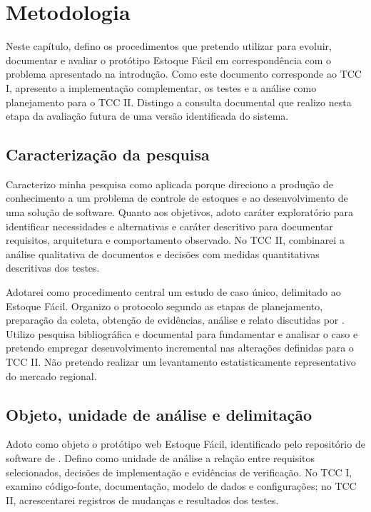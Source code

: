 \chapter{Metodologia}
\label{cap:metodologia}

Neste capítulo, defino os procedimentos que pretendo utilizar para evoluir, documentar e avaliar o protótipo Estoque Fácil em correspondência com o problema apresentado na introdução. Como este documento corresponde ao TCC I, apresento a implementação complementar, os testes e a análise como planejamento para o TCC II. Distingo a consulta documental que realizo nesta etapa da avaliação futura de uma versão identificada do sistema.

\section{Caracterização da pesquisa}

Caracterizo minha pesquisa como aplicada porque direciono a produção de conhecimento a um problema de controle de estoques e ao desenvolvimento de uma solução de software. Quanto aos objetivos, adoto caráter exploratório para identificar necessidades e alternativas e caráter descritivo para documentar requisitos, arquitetura e comportamento observado. No TCC II, combinarei a análise qualitativa de documentos e decisões com medidas quantitativas descritivas dos testes.

Adotarei como procedimento central um estudo de caso único, delimitado ao Estoque Fácil. Organizo o protocolo segundo as etapas de planejamento, preparação da coleta, obtenção de evidências, análise e relato discutidas por . Utilizo pesquisa bibliográfica e documental para fundamentar e analisar o caso e pretendo empregar desenvolvimento incremental nas alterações definidas para o TCC II. Não pretendo realizar um levantamento estatisticamente representativo do mercado regional.

\section{Objeto, unidade de análise e delimitação}

Adoto como objeto o protótipo web Estoque Fácil, identificado pelo repositório de software de . Defino como unidade de análise a relação entre requisitos selecionados, decisões de implementação e evidências de verificação. No TCC I, examino código-fonte, documentação, modelo de dados e configurações; no TCC II, acrescentarei registros de mudanças e resultados dos testes.

